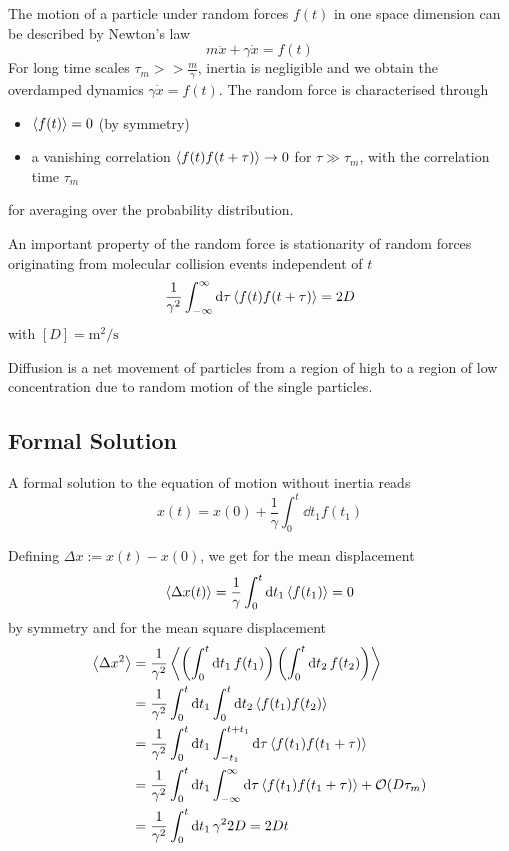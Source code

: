 \documentclass{notebook}
\begin{document}
%
\begin{mdframed}[style=default, frametitle={Model: Random Forces}]
	The motion of a particle under random forces $f(t)$ in one space dimension can be described by Newton's law
	\begin{equation}
	m \ddot{x} + \gamma \dot{x} = f(t)
	\end{equation}
	For long time scales $\tau_m >> \frac{m}{\gamma}$, inertia is negligible and we obtain the overdamped dynamics $\gamma \dot{x} = f(t)$. The random force is characterised through
	\begin{itemize}
		\item{$\expval{f(t)} = 0$ (by symmetry)}
		\item{a vanishing correlation $\expval{f(t)f(t+\tau)} \to 0$ for $\tau \gg \tau_m$, with the correlation time $\tau_m$}
	\end{itemize}
	for averaging over the probability distribution.
\end{mdframed}
%
An important property of the random force is stationarity of random forces originating from molecular collision events independent of $t$
%
\begin{equation}
\frac{1}{\gamma^2}\int_{-\infty}^{\infty}{\dd{\tau} \expval{f(t)f(t+\tau)}} = 2D
\end{equation}
%
with $[D] = \si{\meter \squared \per \second}$
%
\begin{theorem}
	Diffusion is a net movement of particles from a region of high to a region of low concentration due to random motion of the single particles. 
\end{theorem}
%

\subsection*{Formal Solution}

A formal solution to the equation of motion without inertia reads
%
\begin{equation}
x(t) = x(0) + \frac{1}{\gamma} \int_0^t{\dd{t_1} f(t_1)}
\end{equation}
%

Defining $\Delta x := x(t) - x(0)$, we get for the mean displacement
%
\begin{equation}
\expval{\Delta x(t)} = \frac{1}{\gamma} \int_0^t{\dd{t_1} \expval{f(t_1)}} = 0
\end{equation}
%
by symmetry and for the mean square displacement
%
\begin{align*}
\expval{\Delta x^2} &= \frac{1}{\gamma^2} \expval{\left( \int_0^t{\dd{t_1} f(t_1)} \right) \left( \int_0^t{\dd{t_2} f(t_2)} \right)} \\
&= \frac{1}{\gamma^2} \int_0^t \dd{t_1} \int_0^t{\dd{t_2} \expval{f(t_1) f(t_2)}} \\
&= \frac{1}{\gamma^2} \int_0^t \dd{t_1} \int_{-t_1}^{t+t_1}{\dd{\tau} \expval{f(t_1) f(t_1 + \tau)}}\\
&= \frac{1}{\gamma^2} \int_0^t \dd{t_1} \int_{-\infty}^{\infty}{\dd{\tau} \expval{f(t_1) f(t_1 + \tau)}} + \mathcal{O}(D \tau_m)\\		
&= \frac{1}{\gamma^2} \int_0^t{\dd{t_1} \gamma^2 2 D} = 2 D t
\end{align*}
%
\end{document}
